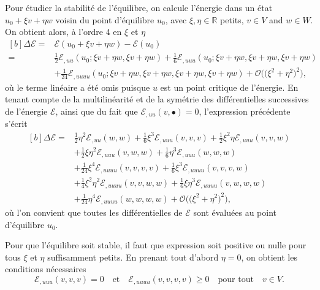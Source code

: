 \documentclass[12pt, final]{amsart}
\newcommand{\LandauO}{\mathcal{O}}
\newcommand{\reals}{\mathbb{R}}
\begin{document}
Pour étudier la stabilité de l'équilibre, on calcule l'énergie dans un état
\(u_0+\xi v+\eta w\) voisin du point d'équilibre \(u_0\), avec
\(\xi, \eta\in\reals\) \guillemotleft{}petits\guillemotright{}, \(v\in V\) and
\(w\in W\). On obtient alors, à l'ordre 4 en \(\xi\) et \(\eta\)
\begin{equation}
  \begin{aligned}[b]
    \Delta\mathcal E ={}&
    \mathcal E(u_0+\xi v+\eta w)-\mathcal E(u_0)\\
    ={}&\tfrac12\mathcal E_{,uu}(u_0;\xi v+\eta w, \xi v+\eta w)
    +\tfrac16\mathcal E_{,uuu}(u_0;\xi v+\eta w, \xi v+\eta w, \xi v+\eta w)\\
    &+\tfrac1{24}\mathcal E_{,uuuu}(u_0;\xi v+\eta w, \xi v+\eta w, \xi v+\eta w,
    \xi v+\eta w)+\LandauO\bigl(\bigl(\xi^2+\eta^2\bigr)^2\bigr),
  \end{aligned}
\end{equation}
où le terme linéaire a été omis puisque \(u\) est un point critique de
l'énergie. En tenant compte de la multilinéarité et de la symétrie des
différentielles successives de l'énergie \(\mathcal E\), ainsi que du fait que
\(\mathcal E_{,uu}(v, \bullet)=0\), l'expression précédente s'écrit
\begin{equation}
  \begin{aligned}[b]
    \Delta\mathcal E
    ={}&\tfrac12\eta^2\mathcal E_{,uu}(w, w)
    +\tfrac16\xi^3\mathcal E_{,uuu}(v, v, v)
    +\tfrac12\xi^2\eta\mathcal E_{,uuu}(v, v, w)\\
    &+\tfrac12\xi\eta^2\mathcal E_{,uuu}(v, w, w)
    +\tfrac16\eta^3\mathcal E_{,uuu}(w, w, w)\\
    &+\tfrac1{24}\xi^4\mathcal E_{,uuuu}(v, v, v, v)
    +\tfrac16\xi^3\mathcal E_{,uuuu}(v, v, v, w)\\
    &+\tfrac14\xi^2\eta^2\mathcal E_{,uuuu}(v, v, w, w)
    +\tfrac16\xi\eta^3\mathcal E_{,uuuu}(v, w, w, w)\\
    &+\tfrac1{24}\eta^4\mathcal E_{,uuuu}(w, w, w, w)
    +\LandauO\bigl(\bigl(\xi^2+\eta^2\bigr)^2\bigr),
  \end{aligned}
\end{equation}
où l'on convient que toutes les différentielles de \(\mathcal E\) sont évaluées
au point d'équilibre \(u_0\).

Pour que l'équilibre soit stable, il faut que expression soit positive ou nulle
pour tous \(\xi\) et \(\eta\) suffisamment petits. En prenant tout d'abord
\(\eta=0\), on obtient les conditions nécessaires
\begin{equation}
  \label{eq:20211108164416}
  \mathcal E_{,uuu}(v, v, v)=0
  \quad\text{et}\quad
  \mathcal E_{,uuuu}(v, v, v, v)\geq0
  \quad\text{pour tout}\quad v\in V.
\end{equation}
\end{document}
